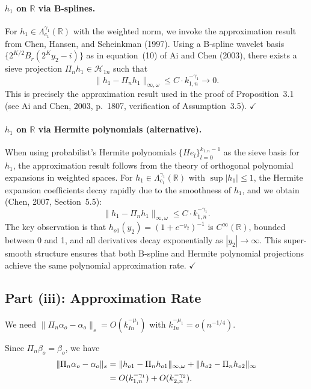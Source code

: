 \documentclass[12pt]{article}
\begin{document}
\paragraph{$h_1$ on $\mathbb{R}$ via B-splines.}
For $h_1 \in \Lambda_{c_1}^{\gamma_1}(\mathbb{R})$ with the weighted norm, we invoke the approximation result from Chen, Hansen, and Scheinkman (1997). Using a B-spline wavelet basis $\{2^{K/2} B_r(2^K y_2 - i)\}$ as in equation~(10) of Ai and Chen (2003), there exists a sieve projection $\Pi_n h_1 \in \mathcal{H}_{1n}$ such that
\begin{equation}\label{eq:h1rate_bspline}
\|h_1 - \Pi_n h_1\|_{\infty, \omega} \leq C \cdot k_{1,n}^{-\gamma_1} \to 0.
\end{equation}
This is precisely the approximation result used in the proof of Proposition~3.1 (see Ai and Chen, 2003, p.~1807, verification of Assumption~3.5). \hfill $\checkmark$

\paragraph{$h_1$ on $\mathbb{R}$ via Hermite polynomials (alternative).}
When using probabilist's Hermite polynomials $\{He_l\}_{l=0}^{k_{1,n}-1}$ as the sieve basis for $h_1$, the approximation result follows from the theory of orthogonal polynomial expansions in weighted spaces. For $h_1 \in \Lambda_{c_1}^{\gamma_1}(\mathbb{R})$ with $\sup|h_1| \leq 1$, the Hermite expansion coefficients decay rapidly due to the smoothness of $h_1$, and we obtain (Chen, 2007, Section~5.5):
\begin{equation}\label{eq:h1rate_hermite}
\|h_1 - \Pi_n h_1\|_{\infty, \omega} \leq C \cdot k_{1,n}^{-\gamma_1}.
\end{equation}
The key observation is that $h_{o1}(y_2) = (1+e^{-y_2})^{-1}$ is $C^\infty(\mathbb{R})$, bounded between 0 and 1, and all derivatives decay exponentially as $|y_2| \to \infty$. This super-smooth structure ensures that both B-spline and Hermite polynomial projections achieve the same polynomial approximation rate. \hfill $\checkmark$

\subsection{Part (iii): Approximation Rate}

We need $\|\Pi_n \alpha_o - \alpha_o\|_s = O(k_{In}^{-\mu_1})$ with $k_{In}^{-\mu_1} = o(n^{-1/4})$.

Since $\Pi_n \beta_o = \beta_o$, we have
\begin{align}
\|\Pi_n \alpha_o - \alpha_o\|_s &= \|h_{o1} - \Pi_n h_{o1}\|_{\infty, \omega} + \|h_{o2} - \Pi_n h_{o2}\|_\infty \notag \\
&= O(k_{1,n}^{-\gamma_1}) + O(k_{2,n}^{-\gamma_2}). \label{eq:combined_rate}
\end{align}
\end{document}
